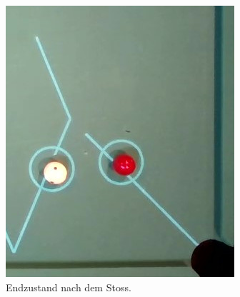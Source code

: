 \begin{figure}[h!]
\begin{subfigure}[t]{0.2\textwidth}
        \includegraphics[width=1.0\linewidth]{../common/04_results/resources/simulation_vs_reality/video_12_0205_0208_end_cut.jpg}
        \caption{Endzustand nach dem Stoss.}
        \label{fig:video_12_0205_0208_end}
    \end{subfigure}
    \hfill
    \begin{subfigure}[t]{0.2\textwidth}
        \centering

\end{subfigure}
\end{figure}
